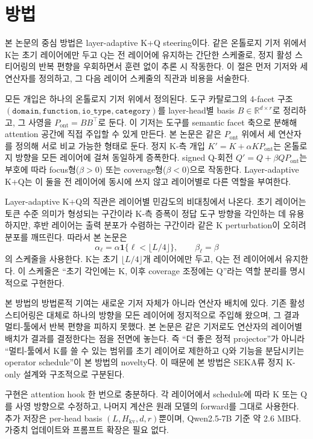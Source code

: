 \section{방법}\label{sec:method}

본 논문의 중심 방법은 layer-adaptive K+Q steering이다. 같은 온톨로지 기저 위에서 K는 초기 레이어에만 두고 Q는 전 레이어에 유지하는 간단한 스케줄로, 정지 활성 스티어링의 반복 편향을 우회하면서 훈련 없이 추론 시 작동한다. 이 절은 먼저 기저와 세 연산자를 정의하고, 그 다음 레이어 스케줄의 직관과 비용을 서술한다.

모든 개입은 하나의 온톨로지 기저 위에서 정의된다. 도구 카탈로그의 4-facet 구조 $(\texttt{domain}, \texttt{function}, \texttt{io\_type}, \texttt{category})$를 layer-head별 basis $B \in \mathbb{R}^{d \times r}$로 정리하고, 그 사영을 $P_{\mathrm{ont}} = BB^\top$로 둔다. 이 기저는 도구를 semantic facet 축으로 분해해 attention 공간에 직접 주입할 수 있게 만든다. 본 논문은 같은 $P_{\mathrm{ont}}$ 위에서 세 연산자를 정의해 서로 비교 가능한 형태로 둔다. 정지 K-측 개입 $K' = K + \alpha K P_{\mathrm{ont}}$는 온톨로지 방향을 모든 레이어에 걸쳐 동일하게 증폭한다. signed Q-회전 $Q' = Q + \beta Q P_{\mathrm{ont}}$는 부호에 따라 focus형($\beta>0$) 또는 coverage형($\beta<0$)으로 작동한다. Layer-adaptive K+Q는 이 둘을 전 레이어에 동시에 쓰지 않고 레이어별로 다른 역할을 부여한다.

Layer-adaptive K+Q의 직관은 레이어별 민감도의 비대칭에서 나온다. 초기 레이어는 토큰 수준 의미가 형성되는 구간이라 K-측 증폭이 정답 도구 방향을 각인하는 데 유용하지만, 후반 레이어는 출력 분포가 수렴하는 구간이라 같은 K perturbation이 오히려 분포를 깨뜨린다. 따라서 본 논문은
\[
\alpha_\ell = \alpha \mathbf{1}\{\ell < \lfloor L/4\rfloor\}, \qquad \beta_\ell = \beta
\]
의 스케줄을 사용한다. K는 초기 $\lfloor L/4\rfloor$개 레이어에만 두고, Q는 전 레이어에서 유지한다. 이 스케줄은 ``초기 각인에는 K, 이후 coverage 조정에는 Q''라는 역할 분리를 명시적으로 구현한다.

본 방법의 방법론적 기여는 새로운 기저 자체가 아니라 연산자 배치에 있다. 기존 활성 스티어링은 대체로 하나의 방향을 모든 레이어에 정지적으로 주입해 왔으며, 그 결과 멀티-툴에서 반복 편향을 피하지 못했다. 본 논문은 같은 기저로도 연산자의 레이어별 배치가 결과를 결정한다는 점을 전면에 놓는다. 즉 ``더 좋은 정적 projector''가 아니라 ``멀티-툴에서 K를 쓸 수 있는 범위를 초기 레이어로 제한하고 Q와 기능을 분담시키는 operator schedule''이 본 방법의 novelty다. 이 때문에 본 방법은 SEKA류 정지 K-only 설계와 구조적으로 구분된다.

구현은 attention hook 한 번으로 충분하다. 각 레이어에서 schedule에 따라 K 또는 Q를 사영 방향으로 수정하고, 나머지 계산은 원래 모델의 forward를 그대로 사용한다. 추가 저장은 per-head basis $(L, H_{\mathrm{kv}}, d, r)$뿐이며, Qwen2.5-7B 기준 약 2.6 MB다. 가중치 업데이트와 프롬프트 확장은 필요 없다.
